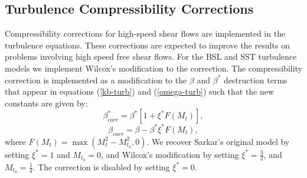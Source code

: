 \subsection{Turbulence Compressibility Corrections}

Compressibility corrections for high-speed shear flows
\cite{Samimy.90,Sarkar.91} are implemented in the turbulence
equations.  These corrections are expected to improve the results on
problems involving high speed free shear flows.  For the BSL and SST
turbulence models we implement Wilcox's \cite{WilcoxBook} modification
to the correction.  The compressibility correction is implemented as a
modification to the $\beta$ and $\beta^*$ destruction terms that
appear in equations (\ref{kb-turb}) and (\ref{omega-turb}) such that
the new constants are given by:
\begin{equation}
\beta^*_{corr} = \beta^*[1+\xi^*F(M_t)], 
\end{equation}
\begin{equation}
\beta_{corr} = \beta-\beta^*\xi^* F(M_t),
\end{equation}
where $F(M_t) = \max(M_t^2 - M^2_{t_0},0)$.  We recover Sarkar's
original model by setting $\xi^* = 1$ and $M_{t_0} = 0$, and Wilcox's
modification by setting $\xi^* = \frac{3}{2}$, and $M_{t_0} =
\frac{1}{4}$.  The correction is disabled by setting $\xi^* = 0$.
